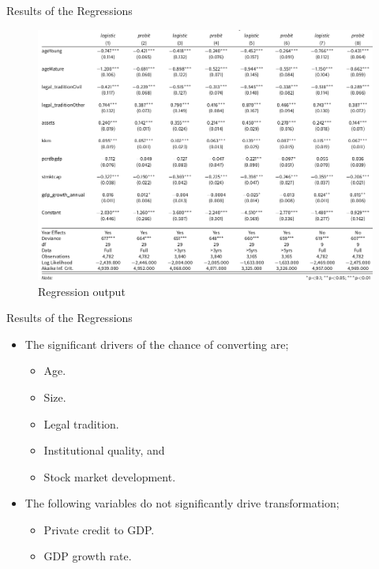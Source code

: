 \documentclass[
  ignorenonframetext,
]{beamer}
\providecommand{\tightlist}{%
  \setlength{\itemsep}{0pt}\setlength{\parskip}{0pt}}
\begin{document}
\begin{frame}{Results of the Regressions}
\protect\hypertarget{results-of-the-regressions}{}
\begin{figure}
\centering
\includegraphics{presentation_shot4.png}
\caption{Regression output}
\end{figure}
\end{frame}

\begin{frame}{Results of the Regressions}
\protect\hypertarget{results-of-the-regressions-1}{}
\begin{itemize}
\item
  The significant drivers of the chance of converting are;

  \begin{itemize}
  \tightlist
  \item
    Age.
  \item
    Size.
  \item
    Legal tradition.
  \item
    Institutional quality, and
  \item
    Stock market development.
  \end{itemize}
\item
  The following variables do not significantly drive transformation;

  \begin{itemize}
  \tightlist
  \item
    Private credit to GDP.
  \item
    GDP growth rate.
  \end{itemize}
\end{itemize}
\end{frame}
\end{document}
